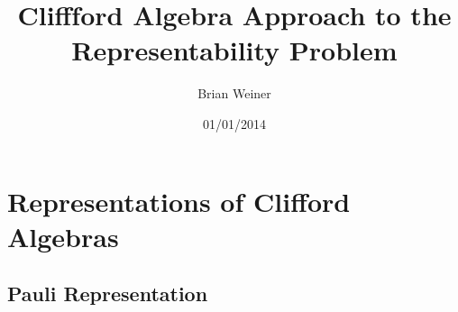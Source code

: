 \documentclass[aps,preprint]{revtex4}%
\begin{document}
\preprint{ }
\title[Representability]{Cliffford Algebra Approach to the Representability Problem}
\author{Brian Weiner}

\begin{abstract}


\end{abstract}
\date{01/01/2014}
\maketitle
\tableofcontents


\section{Representations of Clifford Algebras}

\subsection{Pauli Representation}
\end{document}
